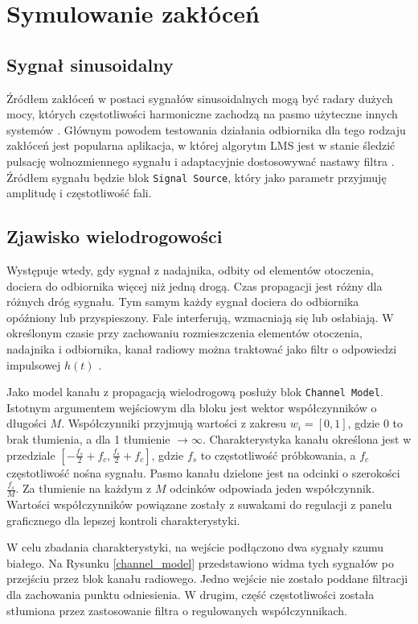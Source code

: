 \section{Symulowanie zakłóceń}
\subsection{Sygnał sinusoidalny}
Źródłem zakłóceń w postaci sygnałów sinusoidalnych mogą być radary dużych mocy, których częstotliwości harmoniczne zachodzą na pasmo użyteczne innych systemów \cite{Haykin:2004:MWC:984217}.
Głównym powodem testowania działania odbiornika dla tego rodzaju zakłóceń jest popularna aplikacja, w której algorytm LMS jest w stanie śledzić pulsację wolnozmiennego sygnału i adaptacyjnie dostosowywać nastawy filtra \cite{Haykin:1996:AFT:230061}.
Źródłem sygnału będzie blok \texttt{Signal Source}, który jako parametr przyjmuję amplitudę i częstotliwość fali. 

\subsection{Zjawisko wielodrogowości}
Występuje wtedy, gdy sygnał z nadajnika, odbity od elementów otoczenia, dociera do odbiornika więcej niż jedną drogą. 
Czas propagacji jest różny dla różnych dróg sygnału. 
Tym samym każdy sygnał dociera do odbiornika opóźniony lub przyspieszony. 
Fale interferują, wzmacniają się lub osłabiają. 
W określonym czasie przy zachowaniu rozmieszczenia elementów otoczenia, nadajnika i odbiornika, kanał radiowy można traktować jako filtr o odpowiedzi impulsowej $h(t)$ \cite{Haykin:2004:MWC:984217}. 

Jako model kanału z propagacją wielodrogową posłuży blok \texttt{Channel Model}. 
Istotnym argumentem wejściowym dla bloku jest wektor współczynników o długości $M$. 
Współczynniki przyjmują wartości z zakresu $w_i = [0,1]$, gdzie 0 to brak tłumienia, a dla 1 tłumienie $\to \infty$. 
Charakterystyka kanału określona jest w przedziale $[-\frac{f_s}{2} + f_c,\frac{f_s}{2} + f_c]$, gdzie $f_s$ to częstotliwość próbkowania, a $f_c$ częstotliwość nośna sygnału. 
Pasmo kanału dzielone jest na odcinki o szerokości $\frac{f_s}{M}$. 
Za tłumienie na każdym z $M$ odcinków odpowiada jeden współczynnik.
Wartości współczynników powiązane zostały z suwakami do regulacji z panelu graficznego dla lepszej kontroli charakterystyki.

W celu zbadania charakterystyki, na wejście podłączono dwa sygnały szumu białego. 
Na Rysunku \ref{channel_model} przedstawiono widma tych sygnałów po przejściu przez blok kanału radiowego. 
Jedno wejście nie zostało poddane filtracji dla zachowania punktu odniesienia. 
W drugim, część częstotliwości została stłumiona przez zastosowanie filtra o regulowanych współczynnikach.

